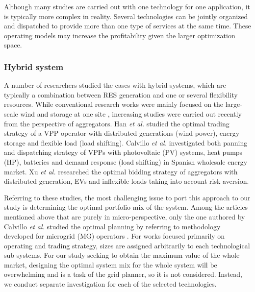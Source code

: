 Although many studies are carried out with one technology for one application, it is typically more complex in reality. Several technologies can be jointly organized and  dispatched to provide more than one type of services at the same time. These operating models may increase the profitability given the larger optimization space.

\subsubsection{Hybrid system}
A number of researchers studied the cases with hybrid systems, which are typically a combination between RES generation and one or several flexibility resources. While conventional research works were mainly focused on the large-scale wind and storage at one site \cite{Bathurst2003,Denholm2009}, increasing studies were carried out recently from the perspective of aggregators. Han \textit{et al.} \cite{Han2017} studied the optimal trading strategy of a VPP operator with distributed generations (wind power), energy storage and flexible load (load shifting). 
Calvillo \textit{et al.} \cite{Calvillo2016} investigated both panning and dispatching strategy of VPPs with photovoltaic (PV) systems, heat pumps (HP), batteries and demand response (load shifting) in Spanish wholesale energy market. Xu \textit{et al.} \cite{Xu2017} researched the optimal bidding strategy of aggregators with distributed generation, EVs and inflexible loads taking into account risk aversion. 

Referring to these studies, the most challenging issue to port this approach to our study is determining the optimal portfolio mix of the system. Among the articles mentioned above that are purely in micro-perspective, only the one authored by Calvillo \textit{et al.} \cite{Calvillo2016} studied the optimal planning by referring to methodology developed for microgrid (MG) operators \cite{Martin-Martinez2016}. For works focused primarily on operating and trading strategy, sizes are assigned arbitrarily to each technological sub-systems. For our study seeking to obtain the maximum value of the whole market, designing the optimal system mix for the whole system will be overwhelming and is a task of the grid planner, so it is not considered. Instead, we conduct separate investigation for each of the selected technologies.


